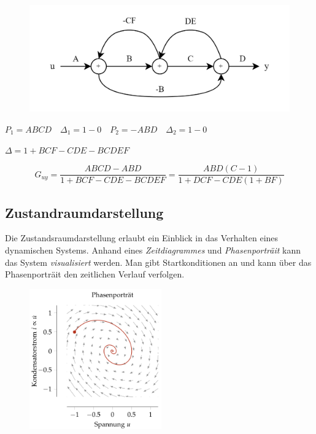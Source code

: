 \documentclass[
  10pt,
  a4paper,
  twocolumn]{article}
\numberwithin{equation}{section}
\begin{document}
\begin{figure}[H]

{\centering \includegraphics{images/paste-66.png}

}

\end{figure}

\(P_1 = ABCD \quad \Delta_1 = 1-0\quad P_2 = -ABD \quad \Delta_2=1-0\)

\(\Delta=1+BCF-CDE-BCDEF\)

\small

\[
G_{uy}=\frac{ABCD-ABD}{1+BCF-CDE-BCDEF}=\frac{ABD(C-1)}{1+DCF-CDE(1+BF)}
\]

\normalsize

\hypertarget{zustandraumdarstellung}{%
\subsection{Zustandraumdarstellung}\label{zustandraumdarstellung}}

Die Zustandsraumdarstellung erlaubt ein Einblick in das Verhalten eines
dynamischen Systems. Anhand eines \emph{Zeitdiagrammes} und
\emph{Phasenporträit} kann das System \emph{visualisiert} werden. Man
gibt Startkonditionen an und kann über das Phasenporträit den zeitlichen
Verlauf verfolgen.

\begin{figure}[H]

{\centering \includegraphics[width=5.7cm,height=\textheight]{images/state_space/quiver.png}

}

\end{figure}
\end{document}
